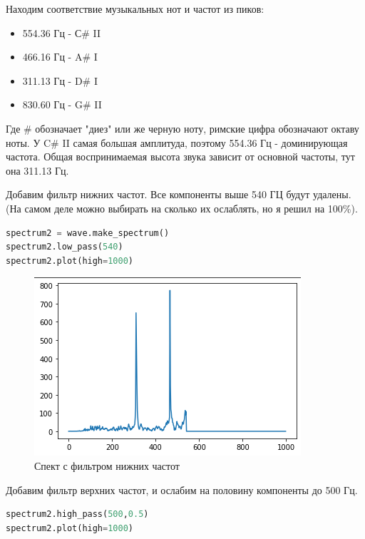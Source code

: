 Находим соответствие музыкальных нот и частот из пиков:
\begin{itemize}
\item 554.36 Гц - С\# II
\item 466.16 Гц -  A\# I
\item 311.13 Гц - D\# I
\item 830.60 Гц - G\# II
\end{itemize}
Где \# обозначает "диез" или же черную ноту, римские цифра обозначают октаву ноты. У C\# II самая большая амплитуда, поэтому 554.36 Гц - доминирующая частота. Общая воспринимаемая высота звука зависит от основной частоты, тут она 311.13 Гц.

Добавим фильтр нижних частот. Все компоненты выше 540 ГЦ будут удалены. (На самом деле можно выбирать на сколько их ослаблять, но я решил на 100\%).

\begin{lstlisting}[language=Python]
spectrum2 = wave.make_spectrum()
spectrum2.low_pass(540)
spectrum2.plot(high=1000)
\end{lstlisting}

\begin{figure}[H]
	\begin{center}
		\includegraphics[scale=1]{fig/lab01/lab1_4.png}
		\caption{Спект с фильтром нижних частот}
	\end{center}
\end{figure}

Добавим фильтр верхних частот, и ослабим на половину компоненты до 500 Гц.

\begin{lstlisting}[language=Python]
spectrum2.high_pass(500,0.5)
spectrum2.plot(high=1000)
\end{lstlisting}

